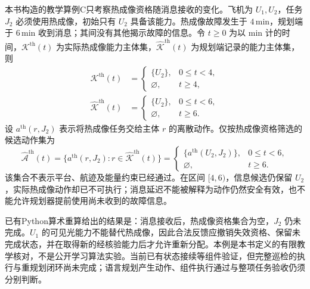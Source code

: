 本书构造的教学算例C只考察热成像资格随消息接收的变化。飞机为 $U_1,U_2$，任务 $J_2$ 必须使用热成像，初始只有 $U_2$ 具备该能力。热成像故障发生于 $4\,\mathrm{min}$，规划端于 $6\,\mathrm{min}$ 收到消息；其间没有其他揭示故障的信息。令 $t\geq0$ 为以 $\mathrm{min}$ 计的时间，$\mathcal K^{\mathrm{th}}(t)$ 为实际热成像能力主体集，$\widehat{\mathcal K}^{\mathrm{th}}(t)$ 为规划端记录的能力主体集，则
\begin{align}
\label{s0310:failure_capability}
\mathcal K^{\mathrm{th}}(t)&=
\begin{cases}
\{U_2\},&0\leq t<4,\\
\varnothing,&t\geq4,
\end{cases}\\
\widehat{\mathcal K}^{\mathrm{th}}(t)&=
\begin{cases}
\{U_2\},&0\leq t<6,\\
\varnothing,&t\geq6.
\end{cases}
\end{align}
设 $a^{\mathrm{th}}(r,J_2)$ 表示将热成像任务交给主体 $r$ 的离散动作。仅按热成像资格筛选的候选动作集为
\begin{equation}
\label{s0310:failure_actions}
\widehat{\mathcal A}^{\mathrm{th}}(t)
=\{a^{\mathrm{th}}(r,J_2):r\in\widehat{\mathcal K}^{\mathrm{th}}(t)\}
=\begin{cases}
\{a^{\mathrm{th}}(U_2,J_2)\},&0\leq t<6,\\
\varnothing,&t\geq6.
\end{cases}
\end{equation}
该集合不表示平台、航迹及能量约束已经通过。在区间 $[4,6)$，信息候选仍保留 $U_2$，实际热成像动作却已不可执行；消息延迟不能被解释为动作仍然安全有效，也不能允许规划器提前使用尚未收到的故障信息。

已有Python算术重算给出的结果是：消息接收后，热成像资格集合为空，$J_2$ 仍未完成。$U_1$ 的可见光能力不能替代热成像，因此合法反馈应撤销失效资格、保留未完成状态，并在取得新的经核验能力后才允许重新分配。本例是本书定义的有限教学核对，不是公开学习算法实验。当前已有状态接续等组件验证，但完整巡检的执行与重规划闭环尚未完成；语言规划产生动作、组件执行通过与整项任务验收仍须分别判断。